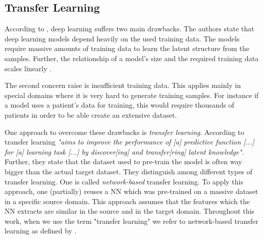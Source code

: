 \subsection{Transfer Learning}
\label{chp:fundamentals:sec:machine_learning:subsec:transfer_learning}
According to \textcite{Tan:2018}, deep learning suffers two main drawbacks.
The authors state that deep learning models depend heavily on the used training data.
The models require massive amounts of training data to learn the latent structure from the samples.
Further, the relationship of a model's size and the required training data scales linearly \parencite{Tan:2018}.

The second concern \textcite{Tan:2018} raise is insufficient training data.
This applies mainly in special domains where it is very hard to generate training samples.
For instance if a model uses a patient's data for training, this would require thousands of patients in order to be able create an extensive dataset.

One approach to overcome these drawbacks is \textit{transfer learning}.
According to \textcite{Tan:2018} transfer learning \textit{"aims to improve the performance of [a] predictive function [...] for [a] learning task [...] by discover[ing] and transfer[ring] latent knowledge"}.
Further, they state that the dataset used to pre-train the model is often way bigger than the actual target dataset.
They distinguish among different types of transfer learning.
One is called \textit{network-based} transfer learning.
To apply this approach, one (partially) reuses a \ac{NN} which was pre-trained on a massive dataset in a specific source domain.
This approach assumes that the features which the \ac{NN} extracts are similar in the source and in the target domain.
Throughout this work, when we use the term "transfer learning" we refer to network-based transfer learning as defined by \textcite{Tan:2018}.
